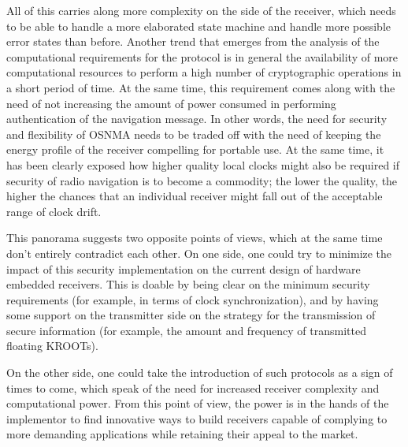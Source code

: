 All of this carries along more complexity on the side of the receiver, which
needs to be able to handle a more elaborated state machine and handle more
possible error states than before. Another trend that emerges from the analysis
of the computational requirements for the protocol is in general the
availability of more computational resources to perform a high number of
cryptographic operations in a short period of time. At the same time, this
requirement comes along with the need of not increasing the amount of power
consumed in performing authentication of the navigation message. In other words,
the need for security and flexibility of OSNMA needs to be traded off with the
need of keeping the energy profile of the receiver compelling for portable use.
At the same time, it has been clearly exposed how higher quality local clocks
might also be required if security of radio navigation is to become a commodity;
the lower the quality, the higher the chances that an individual receiver might
fall out of the acceptable range of clock drift.

\vspace{\baselineskip}

This panorama suggests two opposite points of views, which at the same time
don't entirely contradict each other. On one side, one could try to minimize the
impact of this security implementation on the current design of hardware
embedded receivers. This is doable by being clear on the minimum security
requirements (for example, in terms of clock synchronization), and by having
some support on the transmitter side on the strategy for the transmission of
secure information (for example, the amount and frequency of transmitted
floating KROOTs).

On the other side, one could take the introduction of such protocols as a sign
of times to come, which speak of the need for increased receiver complexity and
computational power. From this point of view, the power is in the hands of the
implementor to find innovative ways to build receivers capable of complying to
more demanding applications while retaining their appeal to the market.
